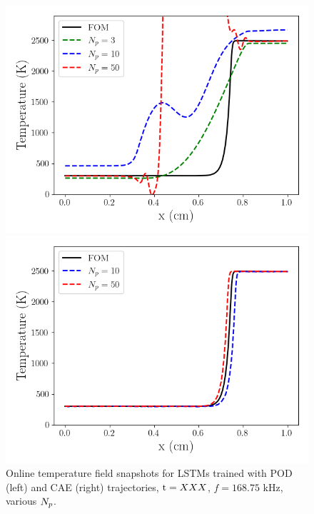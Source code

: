 \begin{figure}
    \begin{minipage}{0.49\linewidth}
        \includegraphics[width=0.99\linewidth]{Chapters/TransientFlame/Images/lstm/pod_rom_temp_snaps.png}
    \end{minipage}
    \begin{minipage}{0.49\linewidth}
        \includegraphics[width=0.99\linewidth]{Chapters/TransientFlame/Images/lstm/cae_rom_temp_snaps.png}
    \end{minipage}
    \caption{Online temperature field snapshots for LSTMs trained with POD (left) and CAE (right) trajectories, $\text{t} = XXX$, $f = 168.75$ kHz, various $N_p$.}
\end{figure}

